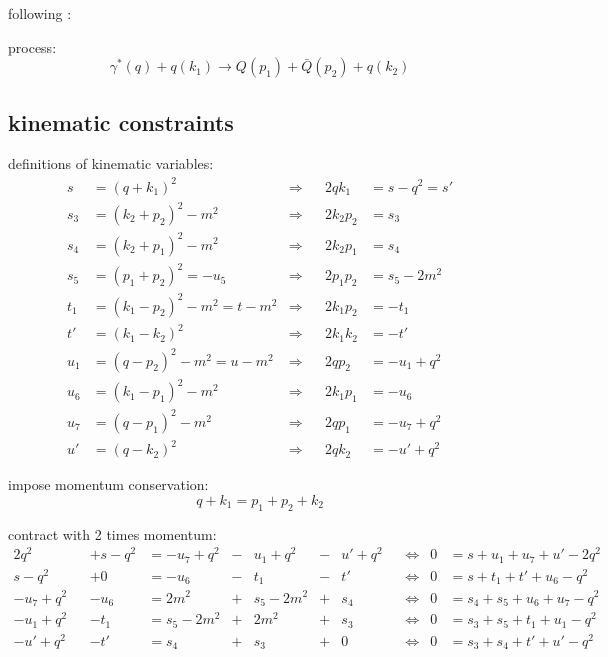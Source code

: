 following \cite{PhysRevD.40.54,van_neerven_dimensional_1986,Marco}:

process:
\begin{equation}
\gamma^*(q) + q(k_1) \rightarrow Q(p_1)+\bar{Q}(p_2) + q(k_2)
\end{equation}

\subsection{kinematic constraints}

definitions of kinematic variables:
\begin{align}
s &= (q+k_1)^2 &\Rightarrow& &2qk_1 &= s-q^2 = s'\\
s_3 &= (k_2+p_2)^2-m^2  &\Rightarrow& &2k_2p_2 &= s_3\\
s_4 &= (k_2+p_1)^2-m^2  &\Rightarrow& &2k_2p_1 &= s_4\\
s_5 &= (p_1+p_2)^2 = -u_5  &\Rightarrow& &2p_1p_2 &= s_5-2m^2\\
t_1 &= (k_1-p_2)^2-m^2 = t - m^2  &\Rightarrow& &2k_1p_2 &=-t_1\\
t' &= (k_1-k_2)^2  &\Rightarrow& &2k_1k_2 &= -t'\\
u_1 &= (q-p_2)^2-m^2 = u - m^2  &\Rightarrow& &2qp_2 &=-u_1+q^2\\
u_6 &= (k_1-p_1)^2 - m^2  &\Rightarrow& &2k_1p_1 &=-u_6\\
u_7 &= (q-p_1)^2 - m^2  &\Rightarrow& &2qp_1 &=-u_7+q^2\\
u' &= (q-k_2)^2  &\Rightarrow& &2qk_2 &=-u'+q^2
\end{align}

impose momentum conservation:
\begin{equation}
q+k_1 = p_1+p_2+k_2
\end{equation}

contract with 2 times momentum:
\begin{align}
2q^2 && +s-q^2 &=-u_7+q^2 &-& u_1+q^2 &-& u'+q^2 &&\Leftrightarrow &0 &=s+u_1+u_7+u'-2q^2 \label{eq:MomCon3wq} \\
s-q^2 && +0 &= -u_6 &-& t_1 &-& t' &&\Leftrightarrow &0 &= s+t_1+t'+u_6-q^2 \label{eq:MomCon3wk1}\\
-u_7+q^2 && -u_6 &= 2m^2 &+& s_5-2m^2 &+& s_4 &&\Leftrightarrow &0 &= s_4+s_5+u_6+u_7-q^2 \label{eq:MomCon3wp1}\\
-u_1+q^2 && -t_1 &= s_5-2m^2 &+& 2m^2 &+& s_3 &&\Leftrightarrow &0 &= s_3+s_5+t_1+u_1-q^2 \label{eq:MomCon3wp2}\\
-u'+q^2 && -t' &= s_4 &+& s_3 &+& 0 &&\Leftrightarrow &0 &= s_3+s_4+t'+u'-q^2 \label{eq:MomCon3wk2}
\end{align}

